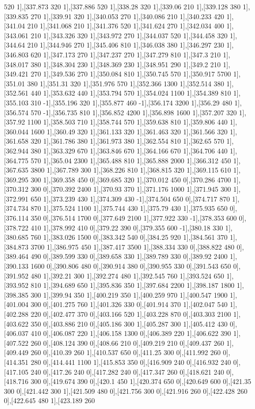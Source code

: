 {520 1],[337.873 320 1],[337.886 520 1],[338.28 320 1],[339.06 210 1],[339.128 380 1],[339.835 270 1],[339.91 320 1],[340.053 270 1],[340.086 210 1],[340.233 420 1],[341.04 210 1],[341.068 210 1],[341.376 520 1],[341.624 270 1],[342.034 400 1],[343.061 210 1],[343.326 320 1],[343.972 270 1],[344.037 520 1],[344.458 320 1],[344.64 210 1],[344.946 270 1],[345.406 810 1],[346.038 380 1],[346.297 230 1],[346.803 620 1],[347.173 270 1],[347.237 270 1],[347.279 810 1],[347.3 210 1],[348.017 380 1],[348.304 230 1],[348.369 230 1],[348.951 290 1],[349.2 210 1],[349.421 270 1],[349.536 270 1],[350.084 810 1],[350.745 570 1],[350.917 5700 1],[351.01 380 1],[351.31 320 1],[351.976 570 1],[352.366 1300 1],[352.514 380 1],[352.561 440 1],[353.632 440 1],[353.794 570 1],[354.024 1100 1],[354.389 810 1],[355.103 310 -1],[355.196 320 1],[355.877 460 -1],[356.174 3200 1],[356.29 480 1],[356.574 570 -1],[356.735 810 1],[356.852 4200 1],[356.898 1600 1],[357.207 320 1],[357.92 1100 1],[358.503 710 1],[358.744 570 1],[359.638 810 1],[359.806 440 1],[360.044 1600 1],[360.49 320 1],[361.133 320 1],[361.463 320 1],[361.566 320 1],[361.658 320 1],[361.786 380 1],[361.973 380 1],[362.554 810 1],[362.65 570 1],[362.944 380 1],[363.329 670 1],[363.846 670 1],[364.166 670 1],[364.706 440 1],[364.775 570 1],[365.04 2300 1],[365.488 810 1],[365.888 2000 1],[366.312 450 1],[367.635 3800 1],[367.789 300 1],[368.226 810 1],[368.815 320 1],[369.115 610 1],[369.295 300 1],[369.358 450 0],[369.685 320 1],[370.012 450 0],[370.286 4700 1],[370.312 300 0],[370.392 2400 1],[370.93 370 1],[371.176 1000 1],[371.945 300 1],[372.991 650 1],[373.239 430 1],[374.309 430 -1],[374.504 650 0],[374.717 870 1],[374.734 870 1],[375.524 1100 1],[375.744 430 1],[375.79 430 1],[375.935 650 0],[376.114 350 0],[376.514 1700 0],[377.649 2100 1],[377.922 330 -1],[378.353 600 0],[378.722 410 1],[378.992 410 0],[379.22 390 0],[379.355 600 -1],[380.18 330 1],[380.685 760 1],[383.026 1500 0],[383.342 540 0],[384.25 920 1],[384.561 370 1],[384.873 3700 1],[386.975 450 1],[387.417 3500 1],[388.334 330 0],[388.822 480 0],[389.464 490 0],[389.599 330 0],[389.658 330 1],[389.789 330 0],[389.92 2400 1],[390.133 1600 0],[390.806 480 0],[390.914 380 0],[390.955 330 0],[391.543 650 0],[391.952 480 1],[392.21 300 1],[392.274 480 1],[392.545 760 1],[393.524 650 1],[393.952 810 1],[394.689 650 1],[395.836 350 1],[397.684 2200 1],[398.187 1800 1],[398.385 300 1],[399.94 350 1],[400.219 350 1],[400.259 970 1],[400.547 1900 1],[401.004 300 0],[401.275 760 1],[401.326 330 0],[401.914 370 1],[402.047 540 1],[402.288 220 0],[402.477 370 0],[403.166 520 1],[403.228 870 0],[403.303 2100 1],[403.622 350 0],[403.886 210 0],[405.186 300 1],[405.287 300 1],[405.412 430 0],[406.037 410 0],[406.087 220 1],[406.158 1300 0],[406.389 220 1],[406.622 390 1],[407.522 260 0],[408.124 390 0],[408.66 210 0],[409.219 210 0],[409.437 260 1],[409.449 260 0],[410.39 260 1],[410.537 650 0],[411.25 300 0],[411.992 260 0],[414.351 280 0],[414.441 1100 1],[415.853 350 0],[416.909 240 0],[416.932 240 0],[417.105 240 0],[417.26 240 0],[417.282 240 0],[417.347 260 0],[418.621 240 0],[418.716 300 0],[419.674 390 0],[420.1 450 1],[420.374 650 0],[420.649 600 0],[421.35 300 0],[421.442 300 1],[421.509 480 0],[421.756 300 0],[421.916 260 0],[422.428 260 0],[422.645 480 1],[423.189 260 }
